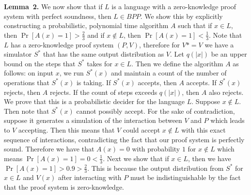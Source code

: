 \documentclass{article}
\begin{document}
\begin{enumerate}[,start=5]
\begin{mdbmarginx}{1ex}{0pt}{1ex}{0pt}%
\noindent{}\textbf{Lemma~2.} \mdbr
{}We now show that if $L$ is a language with a zero-knowledge proof system with perfect soundness, then $L \in BPP$.
We show this by explicitly constructing a probabilistic, polynomial time algorithm $A$ 
such that if $x \in L$, then $\Pr[A(x) = 1] > \frac{2}{3}$ and if $x \notin L$, then $\Pr[A(x) = 1] < \frac{1}{3}$.
Note that $L$ has a zero-knowledge proof system $(P,V)$, therefore for $V* = V$ we have
a simulator $S^*$ that has the same output distribution as $V$. Let $q(|x|)$ be an upper bound
on the steps that $S^*$ takes for $x \in L$. Then we define the algorithm $A$ as follows:
on input $x$, we run $S^*(x)$ and maintain a count of the number of operations that $S^*(x)$ is taking.
If $S^*(x)$ accepts, then $A$ accepts. If $S^*(x)$ rejects, then $A$ rejects. If the count of steps
exceeds $q(|x|)$, then $A$ also rejects. We prove that this is a probabilistic decider for 
the language $L$. Suppose $x \notin L$. Then note that $S^*(x)$ cannot possibly accept. For the
sake of contradiction, suppose it generates a simulation of the interaction between $V$ and $P$ 
which leads to $V$ accepting. Then this means that $V$ could accept $x \notin L$ with this 
exact sequence of interactions, contradicting the fact that our proof system is perfectly sound.
Therefore we have that $A(x) = 0$ with probability $1$ for $x \notin L$ which means
$\Pr[A(x) = 1] = 0 < \frac{1}{3}$. Next we show that 
if $x \in L$, then we have $\Pr[A(x) = 1] > 0.9 > \frac{2}{3}$. This is because the output 
distribution from $S^*$ for $x \in L$ and $V(x)$ after interacting with $P$ must be 
indistinguishable by the fact that the proof system is zero-knowledge.%
\end{mdbmarginx}%


\end{enumerate}
\end{document}
